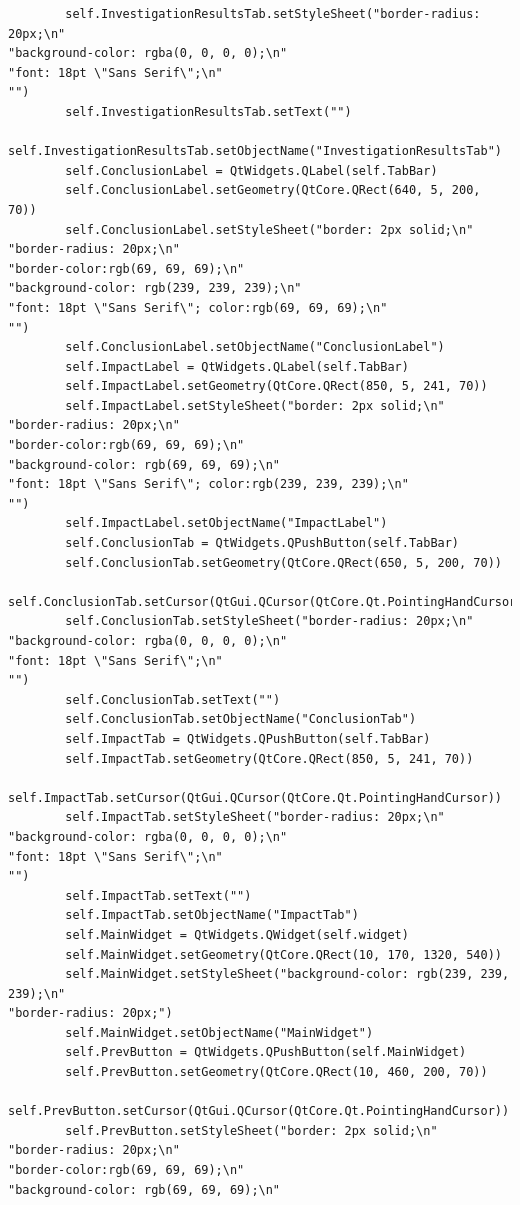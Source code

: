 \documentclass{article}
\begin{document}
\begin{lstlisting}
        self.InvestigationResultsTab.setStyleSheet("border-radius: 20px;\n"
"background-color: rgba(0, 0, 0, 0);\n"
"font: 18pt \"Sans Serif\";\n"
"")
        self.InvestigationResultsTab.setText("")
        self.InvestigationResultsTab.setObjectName("InvestigationResultsTab")
        self.ConclusionLabel = QtWidgets.QLabel(self.TabBar)
        self.ConclusionLabel.setGeometry(QtCore.QRect(640, 5, 200, 70))
        self.ConclusionLabel.setStyleSheet("border: 2px solid;\n"
"border-radius: 20px;\n"
"border-color:rgb(69, 69, 69);\n"
"background-color: rgb(239, 239, 239);\n"
"font: 18pt \"Sans Serif\"; color:rgb(69, 69, 69);\n"
"")
        self.ConclusionLabel.setObjectName("ConclusionLabel")
        self.ImpactLabel = QtWidgets.QLabel(self.TabBar)
        self.ImpactLabel.setGeometry(QtCore.QRect(850, 5, 241, 70))
        self.ImpactLabel.setStyleSheet("border: 2px solid;\n"
"border-radius: 20px;\n"
"border-color:rgb(69, 69, 69);\n"
"background-color: rgb(69, 69, 69);\n"
"font: 18pt \"Sans Serif\"; color:rgb(239, 239, 239);\n"
"")
        self.ImpactLabel.setObjectName("ImpactLabel")
        self.ConclusionTab = QtWidgets.QPushButton(self.TabBar)
        self.ConclusionTab.setGeometry(QtCore.QRect(650, 5, 200, 70))
        self.ConclusionTab.setCursor(QtGui.QCursor(QtCore.Qt.PointingHandCursor))
        self.ConclusionTab.setStyleSheet("border-radius: 20px;\n"
"background-color: rgba(0, 0, 0, 0);\n"
"font: 18pt \"Sans Serif\";\n"
"")
        self.ConclusionTab.setText("")
        self.ConclusionTab.setObjectName("ConclusionTab")
        self.ImpactTab = QtWidgets.QPushButton(self.TabBar)
        self.ImpactTab.setGeometry(QtCore.QRect(850, 5, 241, 70))
        self.ImpactTab.setCursor(QtGui.QCursor(QtCore.Qt.PointingHandCursor))
        self.ImpactTab.setStyleSheet("border-radius: 20px;\n"
"background-color: rgba(0, 0, 0, 0);\n"
"font: 18pt \"Sans Serif\";\n"
"")
        self.ImpactTab.setText("")
        self.ImpactTab.setObjectName("ImpactTab")
        self.MainWidget = QtWidgets.QWidget(self.widget)
        self.MainWidget.setGeometry(QtCore.QRect(10, 170, 1320, 540))
        self.MainWidget.setStyleSheet("background-color: rgb(239, 239, 239);\n"
"border-radius: 20px;")
        self.MainWidget.setObjectName("MainWidget")
        self.PrevButton = QtWidgets.QPushButton(self.MainWidget)
        self.PrevButton.setGeometry(QtCore.QRect(10, 460, 200, 70))
        self.PrevButton.setCursor(QtGui.QCursor(QtCore.Qt.PointingHandCursor))
        self.PrevButton.setStyleSheet("border: 2px solid;\n"
"border-radius: 20px;\n"
"border-color:rgb(69, 69, 69);\n"
"background-color: rgb(69, 69, 69);\n"

\end{lstlisting}
\end{document}
